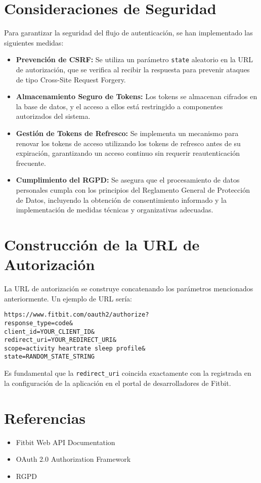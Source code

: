 \section{Consideraciones de Seguridad}

Para garantizar la seguridad del flujo de autenticación, se han implementado las siguientes medidas:

\begin{itemize}
    \item \textbf{Prevención de CSRF:} Se utiliza un parámetro \texttt{state} aleatorio en la URL de autorización, que se verifica al recibir la respuesta para prevenir ataques de tipo Cross-Site Request Forgery.
    
    \item \textbf{Almacenamiento Seguro de Tokens:} Los tokens se almacenan cifrados en la base de datos, y el acceso a ellos está restringido a componentes autorizados del sistema.
    
    \item \textbf{Gestión de Tokens de Refresco:} Se implementa un mecanismo para renovar los tokens de acceso utilizando los tokens de refresco antes de su expiración, garantizando un acceso continuo sin requerir reautenticación frecuente.
    
    \item \textbf{Cumplimiento del RGPD:} Se asegura que el procesamiento de datos personales cumpla con los principios del Reglamento General de Protección de Datos, incluyendo la obtención de consentimiento informado y la implementación de medidas técnicas y organizativas adecuadas.
\end{itemize}

\section{Construcción de la URL de Autorización}

La URL de autorización se construye concatenando los parámetros mencionados anteriormente. Un ejemplo de URL sería:

\begin{verbatim}
https://www.fitbit.com/oauth2/authorize?
response_type=code&
client_id=YOUR_CLIENT_ID&
redirect_uri=YOUR_REDIRECT_URI&
scope=activity heartrate sleep profile&
state=RANDOM_STATE_STRING
\end{verbatim}

Es fundamental que la \texttt{redirect\_uri} coincida exactamente con la registrada en la configuración de la aplicación en el portal de desarrolladores de Fitbit.


\section{Referencias}

\begin{itemize}
    \item Fitbit Web API Documentation \cite{fitbit_api_docs}
    \item OAuth 2.0 Authorization Framework \cite{Auth_Tutorial}
    \item RGPD \cite{gdpr2016}
\end{itemize}
